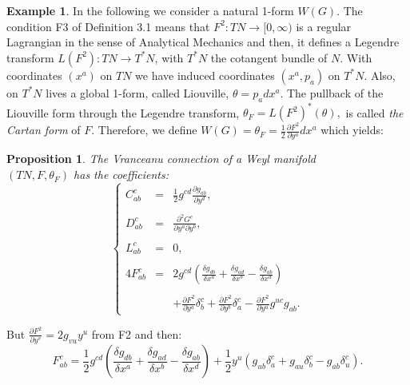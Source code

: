 \documentclass[11pt,oneside,english]{amsart}
\numberwithin{equation}{section}
\numberwithin{figure}{section}
\theoremstyle{plain}
\theoremstyle{definition}
\theoremstyle{definition}
\newtheorem{example}[thm]{Example}
\theoremstyle{plain}
\newtheorem{prop}[thm]{Proposition}
\theoremstyle{plain}
\theoremstyle{remark}
\theoremstyle{remark}
\begin{document}
\medskip{}

\begin{example}
In the following we consider a natural 1-form $W(G)$. The condition
F3 of Definition 3.1 means that $F^{2}:TN\rightarrow[0,\infty)$ is
a regular Lagrangian in the sense of Analytical Mechanics and then,
it defines a Legendre transform $L(F^{2}):TN\rightarrow T^{*}N$,
with $T^{*}N$ the cotangent bundle of $N$. With coordinates $(x^{a})$
on $TN$ we have induced coordinates $(x^{a},p_{a})$ on $T^{*}N$.
Also, on $T^{*}N$ lives a global 1-form, called Liouville, $\theta=p_{a}dx^{a}$.
The pullback of the Liouville form through the Legendre transform,
$\theta_{F}=L(F^{2})^{*}(\theta),$ is called \textit{the Cartan form}
of $F$. Therefore, we define $W(G)=\theta_{F}=\frac{1}{2}\frac{\partial F^{2}}{\partial y^{a}}dx^{a}$
which yields:
\end{example}
\medskip{}

\begin{prop}
The Vranceanu connection of a Weyl manifold \\
 $(TN,F,\theta_{F})$ has the coefficients: \begin{equation}
\left\{ \begin{array}{lll}
C_{ab}^{c} & = & \frac{1}{2}g^{cd}\frac{\partial g_{ab}}{\partial y^{d}},\\
\\D_{ab}^{c} & = & \frac{\partial^{2}G^{c}}{\partial y^{a}\partial y^{b}},\\
\\L_{ab}^{c} & = & 0,\\
\\4F_{ab}^{c} & = & 2g^{cd}\left(\frac{\delta g_{db}}{\delta x^{a}}+\frac{\delta g_{ad}}{\delta x^{b}}-\frac{\delta g_{ab}}{\delta x^{d}}\right)\\
\\ &  & +\frac{\partial F^{2}}{\partial y^{a}}\delta_{b}^{c}+\frac{\partial F^{2}}{\partial y^{b}}\delta_{a}^{c}-\frac{\partial F^{2}}{\partial y^{u}}g^{uc}g_{ab}.\end{array}\right.\label{eq:43}\end{equation}

\end{prop}
But $\frac{\partial F^{2}}{\partial y^{v}}=2g_{vu}y^{u}$ from F2
and then: \begin{equation}
F_{ab}^{c}=\frac{1}{2}g^{cd}\left(\frac{\delta g_{db}}{\delta x^{a}}+\frac{\delta g_{ad}}{\delta x^{b}}-\frac{\delta g_{ab}}{\delta x^{d}}\right)+\frac{1}{2}y^{u}\left(g_{ub}\delta_{a}^{c}+g_{au}\delta_{b}^{c}-g_{ab}\delta_{u}^{c}\right).\label{eq:44}\end{equation}
\end{document}
